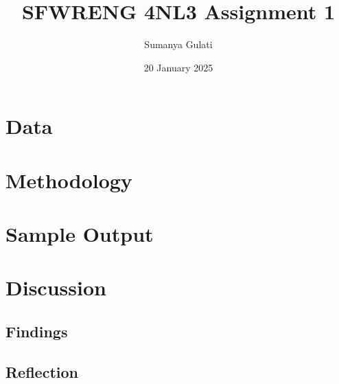 \documentclass[titlepage]{article}
\title{SFWRENG 4NL3 Assignment 1}
\author{Sumanya Gulati}
\date{20 January 2025}
\begin{document}
\begin{titlepage}
    \maketitle
\end{titlepage}

\newpage 

\tableofcontents
\listoftables
\listoffigures

\newpage

\section{Data}

\section{Methodology}

\section{Sample Output}

\section{Discussion}
\subsection{Findings}
\subsection{Reflection}
\end{document}
